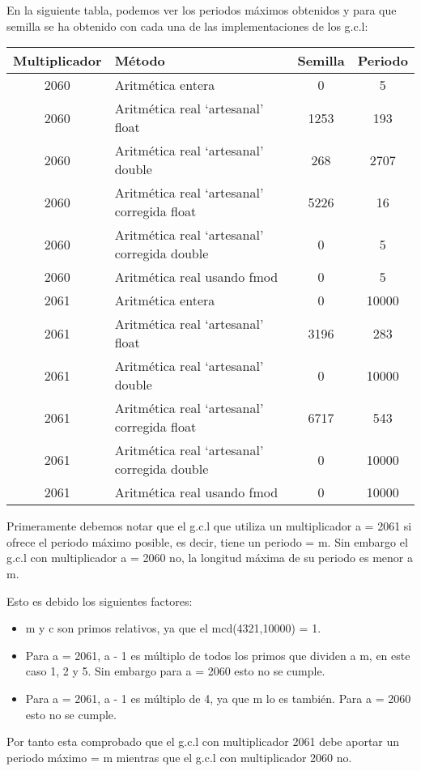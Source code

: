 En la siguiente tabla, podemos ver los periodos máximos obtenidos y para que semilla se ha obtenido con cada una de las implementaciones de los g.c.l:
\begin{table}[H]
\centering
\begin{tabular}{|c|l|c|c|}
\hline
\textbf{Multiplicador} & \textbf{Método} & \textbf{Semilla} & \textbf{Periodo} \\ \hline
2060 & Aritmética entera & 0 & 5 \\
2060 & Aritmética real `artesanal' float & 1253 & 193 \\
2060 & Aritmética real `artesanal' double & 268 & 2707 \\
2060 & Aritmética real `artesanal' corregida float & 5226 & 16 \\
2060 & Aritmética real `artesanal' corregida double & 0 & 5 \\
2060 & Aritmética real usando fmod & 0 & 5 \\
2061 & Aritmética entera & 0 & 10000 \\
2061 & Aritmética real `artesanal' float & 3196 & 283 \\
2061 & Aritmética real `artesanal' double & 0 & 10000 \\
2061 & Aritmética real `artesanal' corregida float & 6717 & 543 \\
2061 & Aritmética real `artesanal' corregida double & 0 & 10000 \\
2061 & Aritmética real usando fmod & 0 & 10000 \\ \hline
\end{tabular}
\end{table}
Primeramente debemos notar que el g.c.l que utiliza un multiplicador a = 2061 si ofrece el periodo máximo posible, es decir, tiene un periodo = m. Sin embargo el g.c.l con multiplicador a = 2060 no, la longitud máxima de su periodo es menor a m.

\newpage

Esto es debido los siguientes factores:
\begin{itemize}
	\item m y c son primos relativos, ya que el mcd(4321,10000) = 1.
	\item Para a = 2061, a - 1 es múltiplo de todos los primos que dividen a m, en este caso 1, 2 y 5. Sin embargo para a = 2060 esto no se cumple.
	\item Para a = 2061, a - 1 es múltiplo de 4, ya que m lo es también. Para a = 2060 esto no se cumple.
\end{itemize}
Por tanto esta comprobado que el g.c.l con multiplicador 2061 debe aportar un periodo máximo = m mientras que el g.c.l con multiplicador 2060 no.

